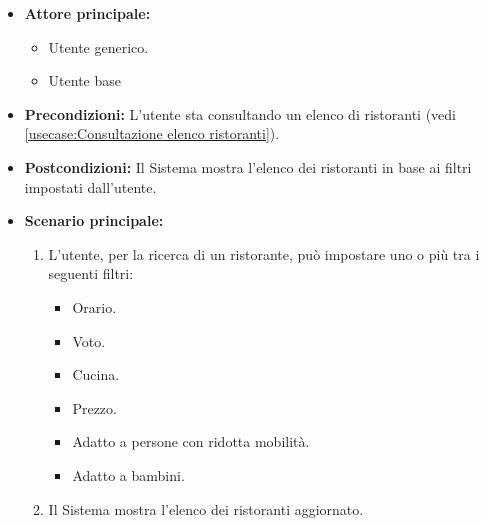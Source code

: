 \label{usecase:Filtra ristoranti}
\begin{itemize}
	\item \textbf{Attore principale:}
    \begin{itemize}
        \item Utente generico.
        \item Utente base
    \end{itemize}
	
	\item \textbf{Precondizioni:} L'utente sta consultando un elenco di ristoranti (vedi \autoref{usecase:Consultazione elenco ristoranti}).

	\item \textbf{Postcondizioni:} Il Sistema mostra l'elenco dei ristoranti in base ai filtri impostati dall'utente.
 
	      
	\item \textbf{Scenario principale:}
	      \begin{enumerate}
		      \item L'utente, per la ricerca di un ristorante, può impostare uno o più tra i seguenti filtri:
		      \begin{itemize}
                \item Orario.
                \item Voto.
                \item Cucina.
                \item Prezzo.
                \item Adatto a persone con ridotta mobilità.
                \item Adatto a bambini.
              \end{itemize}

		      \item Il Sistema mostra l'elenco dei ristoranti aggiornato.
	      \end{enumerate}

\end{itemize}
